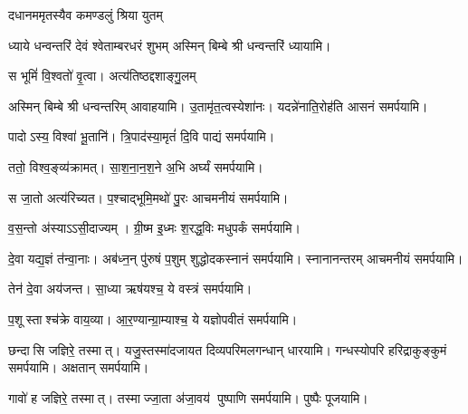 {दधानममृतस्यैव कमण्डलुं श्रिया युतम्}

{ध्याये धन्वन्तरिं देवं श्वेताम्बरधरं शुभम्}
अस्मिन् बिम्बे श्री धन्वन्तरिं ध्यायामि।
\medskip

{स भूमिं॑ वि॒श्वतो॑ वृ॒त्वा। अत्य॑तिष्ठद्दशाङ्गु॒लम्}

अस्मिन् बिम्बे श्री धन्वन्तरिम् आवाहयामि।
\medskip
{}
 {उ॒तामृ॑त॒त्वस्येशा॑नः। यदन्ने॑नाति॒रोह॑ति}
 आसनं समर्पयामि।\medskip

{पादोऽस्य॒ विश्वा॑ भू॒तानि॑। त्रि॒पाद॑स्या॒मृतं॑ दि॒वि}
 पाद्यं समर्पयामि।\medskip
 
{ततो॒ विश्व॒ङ्व्य॑क्रामत्। सा॒श॒ना॒न॒श॒ने अ॒भि}
 अर्घ्यं समर्पयामि।\medskip

{स जा॒तो अत्य॑रिच्यत। प॒श्चाद्भूमि॒मथो॑ पु॒रः}
 आचमनीयं समर्पयामि।\medskip

{व॒स॒न्तो अ॑स्याऽऽसी॒दाज्यम्। ग्री॒ष्म इ॒ध्मः श॒रद्ध॒विः}
मधुपर्कं समर्पयामि।\medskip

 {दे॒वा यद्य॒ज्ञं त॑न्वा॒नाः। अब॑ध्न॒न् पु॑रुषं प॒शुम्}
 शुद्धोदकस्नानं समर्पयामि। स्नानानन्तरम् आचमनीयं समर्पयामि।\medskip

 {तेन॑ दे॒वा अय॑जन्त। सा॒ध्या ऋष॑यश्च॒ ये}
 वस्त्रं समर्पयामि।\medskip

{प॒शूस्ताश्च॑क्रे वाय॒व्या\sn{}। आ॒र॒ण्यान्ग्रा॒म्याश्च॒ ये}
 यज्ञोपवीतं समर्पयामि।\medskip

{छन्दासि जज्ञिरे॒ तस्मात्। यजु॒स्तस्मा॑दजायत}
 दिव्यपरिमलगन्धान् धारयामि। गन्धस्योपरि हरिद्राकुङ्कुमं समर्पयामि। अक्षतान् समर्पयामि।\medskip

{गावो॑ ह जज्ञिरे॒ तस्मात्। तस्माज्जा॒ता अ॑जा॒वय॑}
  पुष्पाणि समर्पयामि।  पुष्पैः पूजयामि।


